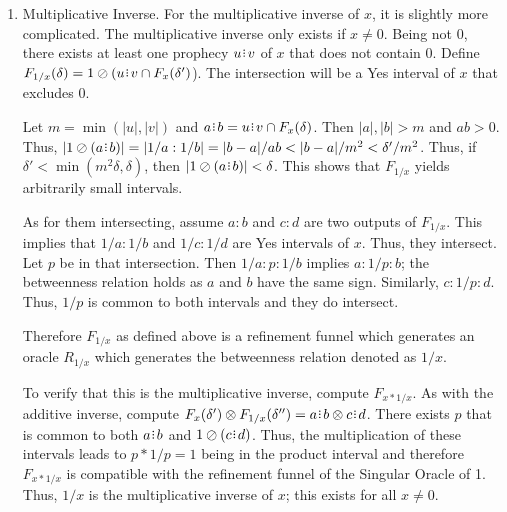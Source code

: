\documentclass[12pt]{article}
\begin{document}
\begin{enumerate}
    To verify that this is the additive inverse, note that $F_x(\delta') \oplus F_{-x}( \delta'') = F_x(\delta') \oplus  (\ominus F_{x}( \delta'') ) = a \rint b \oplus (\ominus c\rint d ) = a \rint b \oplus -c \rint -d$. Since $F_x$ is a refinement funnel there exists $p$ such that $a : p : b$ and $c : p :d$ implying $-c: -p : -d$. Thus $p -p = 0$ is an element of  $F_x(\delta') \oplus F_{-x}( \delta'')$. This is true for all $\delta'$ and $\delta''$. Hence, $0$ is an element of all of the outputs of $F_{x -x}$. This means they intersect $0:0$ which implies this is equivalent to the singular oracle $0$'s refinement funnel. Thus, $x-x = 0$. 
    
    \item Multiplicative Inverse. For the multiplicative inverse of $x$, it is slightly more complicated. The multiplicative inverse only exists if $x \neq 0$. Being not $0$, there exists at least one prophecy $u\rint v$ of $x$ that does not contain 0. Define $F_{1/x}(\delta) = 1 \oslash (u \rint v \cap F_x(\delta')$). The intersection will be a Yes interval of $x$ that excludes 0. 
    
    Let $m = \min(|u|, |v|)$ and $a \rint b = u \rint v \cap F_x(\delta)$. Then $|a|, |b| > m$ and $ab > 0$. Thus, $|1 \oslash (a \rint b)| = |1/a : 1/b| = |b-a|/ab < |b-a|/m^2 < \delta'/m^2$. Thus, if $\delta' < \min(m^2 \delta, \delta)$, then $|1 \oslash (a \rint b)| < \delta$. This shows that $F_{1/x}$ yields arbitrarily small intervals. 

    As for them intersecting, assume $a:b$ and $c:d$ are two outputs of $F_{1/x}$. This implies that $1/a:1/b$ and $1/c:1/d$ are Yes intervals of $x$. Thus, they intersect. Let $p$ be in that intersection. Then $1/a : p : 1/b$ implies $a : 1/p : b $; the betweenness relation holds as $a$ and $b$ have the same sign. Similarly, $c: 1/p : d$. Thus, $1/p$ is common to both intervals and they do intersect. 
        
    Therefore $F_{1/x}$ as defined above is a refinement funnel which generates an oracle $R_{1/x}$ which generates the betweenness relation denoted as $1/x$. 

    To verify that this is the multiplicative inverse, compute $F_{x*1/x}$. As with the additive inverse, compute $F_x(\delta') \otimes F_{1/x}(\delta'') = a\rint b \otimes c\rint d$. There exists $p$ that is common to both $a\rint b$ and $1 \oslash (c\rint d)$. Thus, the multiplication of these intervals leads to $p *1/p = 1$ being in the product interval and therefore $F_{x*1/x}$ is compatible with the refinement funnel of the Singular Oracle of 1. Thus, $1/x$ is the multiplicative inverse of $x$; this exists for all $x \neq 0$. 

\end{enumerate}
\end{document}
